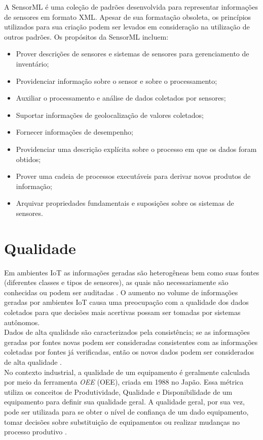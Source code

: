      \quad A \acrfull{SensorML} \cite{SML} é uma coleção de padrões
    desenvolvida para representar informações de sensores em formato XML. Apesar de sua formatação obsoleta, os princípios utilizados para sua criação podem ser levados em consideração na utilização de outros padrões. Os propósitos da \acrshort{SensorML} incluem:
    \begin{itemize}
      \item Prover descrições de sensores e sistemas de sensores para gerenciamento de inventário;
      \item Providenciar informação sobre o sensor e sobre o processamento;
      \item Auxiliar o processamento e análise de dados coletados por sensores;
      \item Suportar informações de geolocalização de valores coletados;
      \item Fornecer informações de desempenho;
      \item Providenciar uma descrição explícita sobre o processo em que os dados foram obtidos;
      \item Prover uma cadeia de processos executáveis para derivar novos produtos de informação;
      \item Arquivar propriedades fundamentais e suposições sobre os sistemas de sensores.
    \end{itemize}
\section{Qualidade}
\label{sec:qualidade}
\quad Em ambientes \acrshort{IoT} as informações geradas são heterogêneas bem como suas fontes (diferentes classes e tipos de sensores), as quais não necessariamente são conhecidas ou podem ser auditadas \cite{dataquality}. O aumento no volume de informações geradas por ambientes \acrshort{IoT} causa uma preocupação com a qualidade dos dados coletados para que decisões mais acertivas possam ser tomadas por sistemas autônomos.
\\\null\quad Dados de alta qualidade são caracterizados pela consistência; se as informações geradas por fontes novas podem ser consideradas consistentes com as informações coletadas por fontes já verificadas, então os novos dados podem ser considerados de alta qualidade \cite{dataquality}.
\\\null\quad No contexto industrial, a qualidade de um equipamento é geralmente calculada por meio da ferramenta \textit{\acrlong{OEE}} (\acrshort{OEE}), criada em 1988 no Japão. Essa métrica utiliza os conceitos de Produtividade, Qualidade e Disponibilidade de um equipamento para definir sua qualidade geral. A qualidade geral, por sua vez, pode ser utilizada para se obter o nível de confiança de um dado equipamento, tomar decisões sobre substituição de equipamentos ou realizar mudanças no processo produtivo \cite{artigoOEE}.

